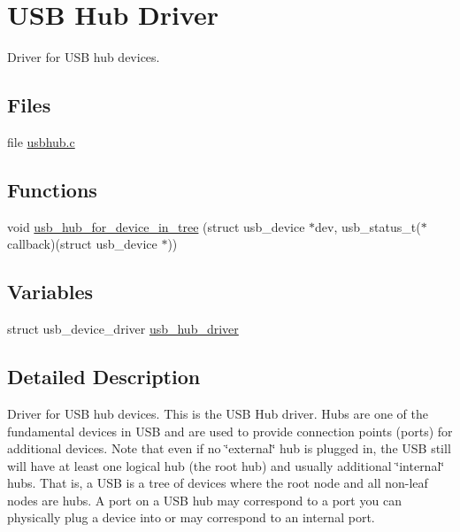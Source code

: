 \hypertarget{group__usbhub}{\section{U\-S\-B Hub Driver}
\label{group__usbhub}
}


Driver for U\-S\-B hub devices.  


\subsection*{Files}
\begin{DoxyCompactItemize}
\item 
file \hyperlink{usbhub_8c}{usbhub.\-c}
\end{DoxyCompactItemize}
\subsection*{Functions}
\begin{DoxyCompactItemize}
\item 
void \hyperlink{group__usbhub_ga3ca1e7a532628e72cf71eb3e02248e09}{usb\-\_\-hub\-\_\-for\-\_\-device\-\_\-in\-\_\-tree} (struct usb\-\_\-device $\ast$dev, usb\-\_\-status\-\_\-t($\ast$callback)(struct usb\-\_\-device $\ast$))
\end{DoxyCompactItemize}
\subsection*{Variables}
\begin{DoxyCompactItemize}
\item 
struct usb\-\_\-device\-\_\-driver \hyperlink{group__usbhub_ga45355fca9db05572ff83be5f5ba710ec}{usb\-\_\-hub\-\_\-driver}
\end{DoxyCompactItemize}


\subsection{Detailed Description}
Driver for U\-S\-B hub devices. This is the U\-S\-B Hub driver. Hubs are one of the fundamental devices in U\-S\-B and are used to provide connection points (ports) for additional devices. Note that even if no \char`\"{}external\char`\"{} hub is plugged in, the U\-S\-B still will have at least one logical hub (the root hub) and usually additional \char`\"{}internal\char`\"{} hubs. That is, a U\-S\-B is a tree of devices where the root node and all non-\/leaf nodes are hubs. A port on a U\-S\-B hub may correspond to a port you can physically plug a device into or may correspond to an internal port.

